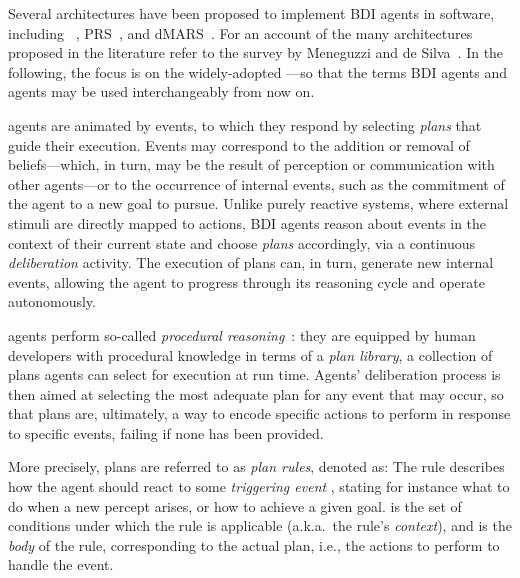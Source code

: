 \documentclass[12pt,a4paper,openright,twoside]{book}
\begin{document}
Several architectures have been proposed to implement \ac{BDI} agents in software, including \agentspeak{}~\cite{RaoG95}, \ac{PRS}~\cite{IngrandGR1992}, and \ac{dMARS}~\cite{DInvernoLGKW04}.
%
For an account of the many architectures proposed in the literature refer to the survey by Meneguzzi and de Silva~\cite{silvaBDIAgentArchitectures2020}.
%
In the following, the focus is on the widely-adopted \agentspeak{}---so that the terms \ac{BDI} agents and \agentspeak{} agents may be used interchangeably from now on.

\agentspeak{} agents are animated by events, to which they respond by selecting \emph{plans} that guide their execution.
%
Events may correspond to the addition or removal of beliefs---which, in turn, may be the result of perception or communication with other agents---or to the occurrence of internal events, such as the commitment of the agent to a new goal to pursue.
%
Unlike purely reactive systems, where external stimuli are directly mapped to actions, \ac{BDI} agents reason about events in the context of their current state and choose \emph{plans} accordingly, via a continuous \emph{deliberation} activity.
%
The execution of plans can, in turn, generate new internal events, allowing the agent to progress through its reasoning cycle and operate autonomously.

\agentspeak{} agents perform so-called \emph{procedural reasoning}~\cite{IngrandGR1992}: they are equipped by human developers with procedural knowledge in terms of a \emph{plan library}, a collection of plans agents can select for execution at run time.
%
Agents' deliberation process is then aimed at selecting the most adequate plan for any event that may occur, so that plans are, ultimately, a way to encode specific actions to perform in response to specific events, failing if none has been provided.

More precisely, \agentspeak{} plans are referred to as \emph{plan rules}, denoted as:
%
%
The rule describes how the agent should react to some \emph{triggering event} , stating for instance what to do when a new percept arises, or how to achieve a given goal.
%
 is the set of conditions under which the rule is applicable (a.k.a.\ the rule's \emph{context}), and  is the \emph{body} of the rule, corresponding to the actual plan, i.e., the actions to perform to handle the event.
\end{document}
